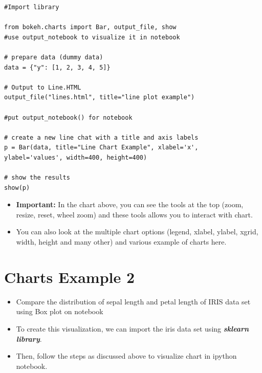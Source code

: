 \documentclass[12pt, a4paper]{report}
\begin{document}
\newpage
\begin{framed}
\begin{verbatim}
#Import library

from bokeh.charts import Bar, output_file, show 
#use output_notebook to visualize it in notebook

# prepare data (dummy data)
data = {"y": [1, 2, 3, 4, 5]}

# Output to Line.HTML
output_file("lines.html", title="line plot example") 

#put output_notebook() for notebook

# create a new line chat with a title and axis labels
p = Bar(data, title="Line Chart Example", xlabel='x', 
ylabel='values', width=400, height=400)

# show the results
show(p)
\end{verbatim}
\end{framed}
\newpage
\begin{itemize}
	\item \textbf{Important:} In the chart above,  you can see the tools at the top (zoom, resize, reset, wheel zoom) and these 
	tools allows you to interact with chart. 
	\item You can also look at the multiple chart options (legend, xlabel, ylabel, xgrid, width, height and many other) and 
	various example of charts here.
\end{itemize}




\section*{Charts Example 2}
\begin{itemize}
	\item Compare the distribution of sepal length and petal length of IRIS data set using 
	Box plot on notebook
	
	\item To create this visualization, we can import the iris data set using \textbf{\textit{sklearn library}}. 
	\item Then, 
	follow the steps as discussed above to visualize chart in ipython notebook.
	
\end{itemize}

\newpage
\end{document}
